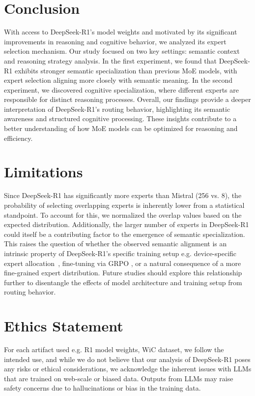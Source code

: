 \section{Conclusion}

With access to DeepSeek-R1’s model weights and motivated by its significant improvements in reasoning and cognitive behavior, we analyzed its expert selection mechanism. Our study focused on two key settings: semantic context and reasoning strategy analysis.
In the first experiment, we found that DeepSeek-R1 exhibits stronger semantic specialization than previous MoE models, with expert selection aligning more closely with semantic meaning. In the second experiment, we discovered cognitive specialization, where different experts are responsible for distinct reasoning processes.
Overall, our findings provide a deeper interpretation of DeepSeek-R1’s routing behavior, highlighting its semantic awareness and structured cognitive processing. These insights contribute to a better understanding of how MoE models can be optimized for reasoning and efficiency.
\clearpage
\section*{Limitations}
Since DeepSeek-R1 has significantly more experts than Mistral (256 vs. 8), the probability of selecting overlapping experts is inherently lower from a statistical standpoint. To account for this, we normalized the overlap values based on the expected distribution.
Additionally, the larger number of experts in DeepSeek-R1 could itself be a contributing factor to the emergence of semantic specialization. This raises the question of whether the observed semantic alignment is an intrinsic property of DeepSeek-R1’s specific training setup e.g. device-specific expert allocation~\citep{liu2024deepseek}, fine-tuning via GRPO \citep{shao2024deepseekmath}, or a natural consequence of a more fine-grained expert distribution. Future studies should explore this relationship further to disentangle the effects of model architecture and training setup from routing behavior.


\section*{Ethics Statement}
For each artifact used e.g. R1 model weights, WiC dataset, we follow the intended use, and while we do not believe that our analysis of DeepSeek-R1 poses any risks or ethical considerations, we acknowledge the inherent issues with LLMs that are trained on web-scale or biased data. Outputs from LLMs may raise safety concerns due to hallucinations or bias in the training data.  
